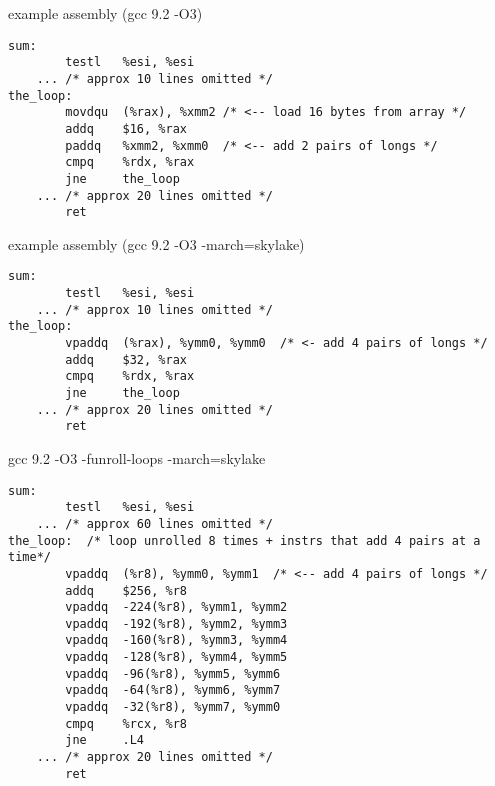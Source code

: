 \begin{frame}[fragile,label=opt3]{example assembly (gcc 9.2 -O3)}
\lstset{language=myasm,style=smaller}
\begin{lstlisting}
sum:
        testl   %esi, %esi
	... /* approx 10 lines omitted */
the_loop:
        movdqu  (%rax), %xmm2 /* <-- load 16 bytes from array */
        addq    $16, %rax
        paddq   %xmm2, %xmm0  /* <-- add 2 pairs of longs */
        cmpq    %rdx, %rax
        jne     the_loop
	... /* approx 20 lines omitted */
        ret
\end{lstlisting}
\end{frame}

\begin{frame}[fragile,label=opt3a]{example assembly (gcc 9.2 -O3 -march=skylake)}
\lstset{language=myasm,style=smaller}
\begin{lstlisting}
sum:
        testl   %esi, %esi
	... /* approx 10 lines omitted */
the_loop:
        vpaddq  (%rax), %ymm0, %ymm0  /* <- add 4 pairs of longs */
        addq    $32, %rax 
        cmpq    %rdx, %rax
        jne     the_loop
	... /* approx 20 lines omitted */
        ret
\end{lstlisting}
\end{frame}


\begin{frame}[fragile,label=opt3b]{gcc 9.2 -O3 -funroll-loops -march=skylake}
\lstset{language=myasm,style=smaller}
\begin{lstlisting}
sum:
        testl   %esi, %esi
	... /* approx 60 lines omitted */
the_loop:  /* loop unrolled 8 times + instrs that add 4 pairs at a time*/
        vpaddq  (%r8), %ymm0, %ymm1  /* <-- add 4 pairs of longs */
        addq    $256, %r8
        vpaddq  -224(%r8), %ymm1, %ymm2
        vpaddq  -192(%r8), %ymm2, %ymm3
        vpaddq  -160(%r8), %ymm3, %ymm4
        vpaddq  -128(%r8), %ymm4, %ymm5
        vpaddq  -96(%r8), %ymm5, %ymm6
        vpaddq  -64(%r8), %ymm6, %ymm7
        vpaddq  -32(%r8), %ymm7, %ymm0
        cmpq    %rcx, %r8
        jne     .L4
	... /* approx 20 lines omitted */
        ret
\end{lstlisting}
\end{frame}

